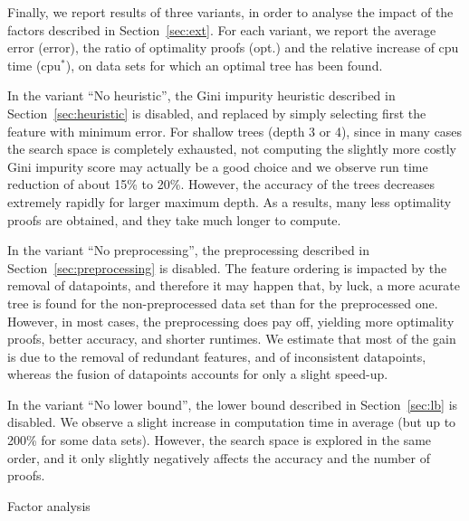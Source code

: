\documentclass{article}
\begin{document}
Finally, we report results of three variants, in order to analyse the impact of the factors described in Section~\ref{sec:ext}. For each variant, we report the average error (error), the ratio of optimality proofs (opt.) and the relative increase of cpu time  (cpu$^*$), on data sets for which an optimal tree has been found.

In the variant ``No heuristic'', the Gini impurity heuristic described in Section~\ref{sec:heuristic} is disabled, and replaced by simply selecting first the feature with minimum error. For shallow trees (depth 3 or 4), since in many cases the search space is completely exhausted, not computing the slightly more costly Gini impurity score may actually be a good choice and we observe run time reduction of about 15\% to 20\%. However, the accuracy of the trees decreases extremely rapidly for larger maximum depth. As a results, many less optimality proofs are obtained, and they take much longer to compute.

In the variant ``No preprocessing'', the preprocessing described in Section~\ref{sec:preprocessing} is disabled. The feature ordering is impacted by the removal of datapoints, and therefore it may happen that, by luck, a more acurate tree is found for the non-preprocessed data set than for the preprocessed one. However, in most cases, the preprocessing does pay off, yielding more optimality proofs, better accuracy, and shorter runtimes. We estimate that most of the gain is due to the removal of redundant features, and of inconsistent datapoints, whereas the fusion of datapoints accounts for only a slight speed-up.

In the variant ``No lower bound'', the lower bound described in Section~\ref{sec:lb} is disabled. We observe a slight increase in computation time in average (but up to 200\% for some data sets). However, the search space is explored in the same order, and it only slightly negatively affects the accuracy and the number of proofs.

\begin{table}[htbp]
\begin{center}
\begin{footnotesize}
\tabcolsep=7pt

\end{footnotesize}
\end{center}
\caption{\label{tab:factor} Factor analysis}
\end{table}
\end{document}

